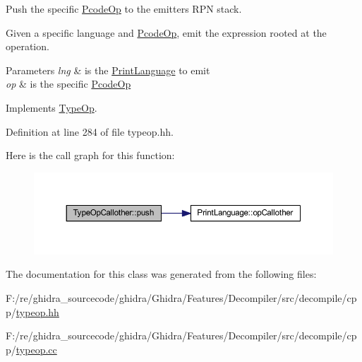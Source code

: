 Push the specific \mbox{\hyperlink{class_pcode_op}{Pcode\+Op}} to the emitter\textquotesingle{}s R\+PN stack. 

Given a specific language and \mbox{\hyperlink{class_pcode_op}{Pcode\+Op}}, emit the expression rooted at the operation. 
\begin{DoxyParams}{Parameters}
{\em lng} & is the \mbox{\hyperlink{class_print_language}{Print\+Language}} to emit \\
\hline
{\em op} & is the specific \mbox{\hyperlink{class_pcode_op}{Pcode\+Op}} \\
\hline
\end{DoxyParams}


Implements \mbox{\hyperlink{class_type_op_ac9c9544203ed74dabe6ac662b653b2af}{Type\+Op}}.



Definition at line 284 of file typeop.\+hh.

Here is the call graph for this function\+:
\nopagebreak
\begin{figure}[H]
\begin{center}
\leavevmode
\includegraphics[width=350pt]{class_type_op_callother_ae5f1ef0859a04beb3efebf3a2216347b_cgraph}
\end{center}
\end{figure}


The documentation for this class was generated from the following files\+:\begin{DoxyCompactItemize}
\item 
F\+:/re/ghidra\+\_\+sourcecode/ghidra/\+Ghidra/\+Features/\+Decompiler/src/decompile/cpp/\mbox{\hyperlink{typeop_8hh}{typeop.\+hh}}\item 
F\+:/re/ghidra\+\_\+sourcecode/ghidra/\+Ghidra/\+Features/\+Decompiler/src/decompile/cpp/\mbox{\hyperlink{typeop_8cc}{typeop.\+cc}}\end{DoxyCompactItemize}

